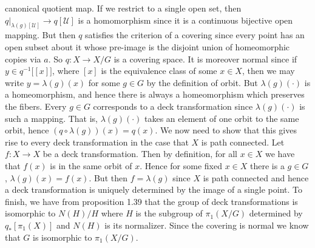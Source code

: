 \documentclass{book}                                                           %
\begin{document}
\begin{bproof}
    canonical quotient map. If we restrict to a single open set, then
    $q|_{\lambda(g)[\mathcal{U}]}\rightarrow{q}[\mathcal{U}]$ is a
    homomorphism since it is a continuous bijective open mapping. But then
    $q$ satisfies the criterion of a covering since every point has an open
    subset about it whose pre-image is the disjoint union of homeomorphic
    copies via $a$. So $q:X\rightarrow{X}/G$ is a covering space. It is
    moreover normal since if $y\in{q}^{\minus{1}}\big[[x]\big]$, where
    $[x]$ is the equivalence class of some $x\in{X}$, then we may write
    $y=\lambda(g)(x)$ for some $g\in{G}$ by the definition of orbit. But
    $\lambda(g)(\cdot)$ is a homeomorphism, and hence there is always a
    homeomorphism which preserves the fibers. Every $g\in{G}$ corresponds to
    a deck transformation since $\lambda(g)(\cdot)$ is such a mapping. That
    is, $\lambda(g)(\cdot)$ takes an element of one orbit to the same orbit,
    hence $(q\circ\lambda(g))(x)=q(x)$. We now need to show that this gives
    rise to every deck transformation in the case that $X$ is path connected.
    Let $f:X\rightarrow{X}$ be a deck transformation. Then by definition,
    for all $x\in{X}$ we have that $f(x)$ is in the same orbit of $x$. Hence
    for some fixed $x\in{X}$ there is a $g\in{G}$, $\lambda(g)(x)=f(x)$.
    But then $f=\lambda(g)$ since $X$ is path connected and hence a deck
    transformation is uniquely determined by the image of a single point.
    To finish, we have from proposition 1.39 that the group of deck transformations
    is isomorphic to $N(H)/H$ where $H$ is the subgroup of $\pi_{1}(X/G)$
    determined by $q_{*}[\pi_{1}(X)]$ and $N(H)$ is its normalizer. Since
    the covering is normal we know that $G$ is isomorphic to $\pi_{1}(X/G)$.
\end{bproof}
            \par\hfill\par
    \clearpage
    
    

    \clearpage
    \printindex
\end{document}
